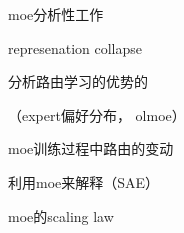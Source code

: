 moe分析性工作

represenation collapse

分析路由学习的优势的

（expert偏好分布， olmoe）

moe训练过程中路由的变动

利用moe来解释（SAE）

moe的scaling law